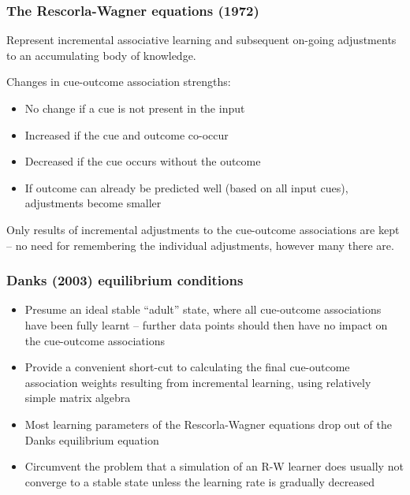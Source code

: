 \begin{frame}
  \frametitle{The Rescorla-Wagner equations (1972)}

  Represent incremental associative learning and subsequent on-going
  adjustments to an accumulating body of knowledge.

  \gap[1]
  Changes in cue-outcome association strengths:
  \begin{itemize}
  \item No change if a cue is not present in the input
  \item Increased if the cue and outcome co-occur
  \item Decreased if the cue occurs without the outcome
  \item If outcome can already be predicted well (based on all input cues),
    adjustments become smaller
  \end{itemize}

  \gap[1] 
  Only results of incremental adjustments to the cue-outcome associations are
  kept -- no need for remembering the individual adjustments, however many
  there are.
\end{frame}

\begin{frame}
  \frametitle{Danks (2003) equilibrium conditions} 

  \begin{itemize}
  \item Presume an ideal stable ``adult'' state, where all cue-outcome
    associations have been fully learnt -- further data points should then
    have no impact on the cue-outcome associations
  \item Provide a convenient short-cut to calculating the final cue-outcome
    association weights resulting from incremental learning, using relatively
    simple matrix algebra
  \item Most learning parameters of the Rescorla-Wagner equations drop
    out of the Danks equilibrium equation
  \item Circumvent the problem that a simulation of an R-W learner does
    usually not converge to a stable state unless the learning rate is
    gradually decreased
  \end{itemize}
\end{frame}

